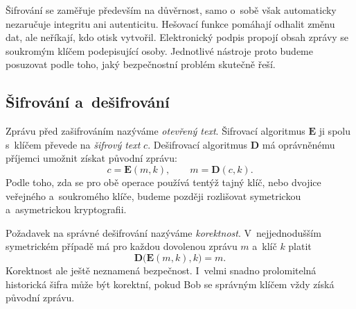 Šifrování se zaměřuje především na důvěrnost, samo o~sobě však automaticky nezaručuje integritu ani autenticitu. Hešovací funkce pomáhají odhalit změnu dat, ale neříkají, kdo otisk vytvořil. Elektronický podpis propojí obsah zprávy se soukromým klíčem podepisující osoby. Jednotlivé nástroje proto budeme posuzovat podle toho, jaký bezpečnostní problém skutečně řeší.


\subsection{Šifrování a~dešifrování}

Zprávu před zašifrováním nazýváme \emph{otevřený text}. Šifrovací algoritmus $\mathbf{E}$ ji spolu s~klíčem převede na \emph{šifrový text} $c$. Dešifrovací algoritmus $\mathbf{D}$ má oprávněnému příjemci umožnit získat původní zprávu:
\[
    c=\mathbf{E}(m,k),
    \qquad
    m=\mathbf{D}(c,k).
\]
Podle toho, zda se pro obě operace používá tentýž tajný klíč, nebo dvojice veřejného a~soukromého klíče, budeme později rozlišovat symetrickou a~asymetrickou kryptografii.

Požadavek na správné dešifrování nazýváme \emph{korektnost}. V~nejjednodušším symetrickém případě má pro každou dovolenou zprávu $m$ a~klíč $k$ platit
\[
    \mathbf{D}\bigl(\mathbf{E}(m,k),k\bigr)=m.
\]
Korektnost ale ještě neznamená bezpečnost. I~velmi snadno prolomitelná historická šifra může být korektní, pokud Bob se správným klíčem vždy získá původní zprávu.


